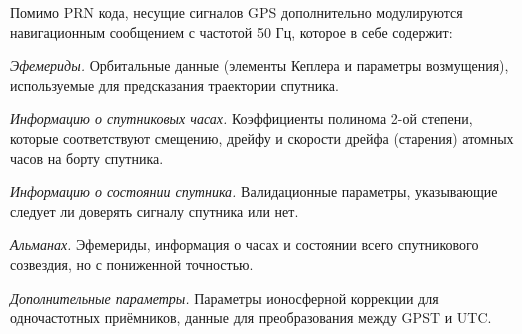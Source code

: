 Помимо PRN кода, несущие сигналов GPS дополнительно модулируются навигационным сообщением с частотой 50 Гц, которое в себе содержит:
\begin{description}[wide]
\item \textit{Эфемериды.}
Орбитальные данные (элементы Кеплера и параметры возмущения), используемые для предсказания траектории спутника.
\item \textit{Информацию о спутниковых часах.}
Коэффициенты полинома 2-ой степени, которые соответствуют смещению, дрейфу и скорости дрейфа (старения) атомных часов на борту спутника.  
\item \textit{Информацию о состоянии спутника.}
Валидационные параметры, указывающие следует ли доверять сигналу спутника или нет.
\item \textit{Альманах.}
Эфемериды, информация о часах и состоянии всего спутникового созвездия, но с пониженной точностью. 
\item \textit{Дополнительные параметры.}
Параметры ионосферной коррекции для одночастотных приёмников, данные для преобразования между GPST и UTC. 
\end{description}